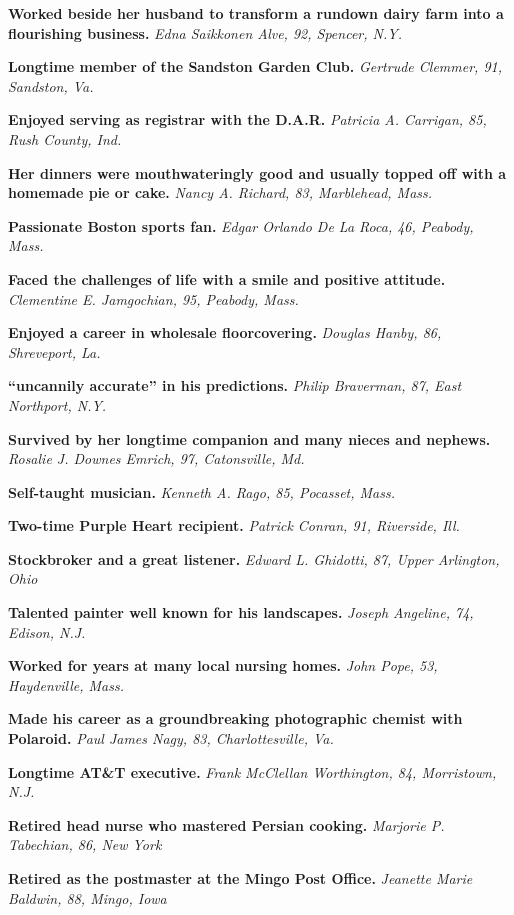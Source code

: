 \textbf{Worked beside her husband to transform a rundown dairy farm into
a flourishing business.} \emph{Edna Saikkonen Alve, 92, Spencer, N.Y.}

\textbf{Longtime member of the Sandston Garden Club.} \emph{Gertrude
Clemmer, 91, Sandston, Va.}

\textbf{Enjoyed serving as registrar with the D.A.R.} \emph{Patricia A.
Carrigan, 85, Rush County, Ind.}

\textbf{Her dinners were mouthwateringly good and usually topped off
with a homemade pie or cake.} \emph{Nancy A. Richard, 83, Marblehead,
Mass.}

\textbf{Passionate Boston sports fan.} \emph{Edgar Orlando De La Roca,
46, Peabody, Mass.}

\textbf{Faced the challenges of life with a smile and positive
attitude.} \emph{Clementine E. Jamgochian, 95, Peabody, Mass.}

\textbf{Enjoyed a career in wholesale floorcovering.} \emph{Douglas
Hanby, 86, Shreveport, La.}

\textbf{``uncannily accurate'' in his predictions.} \emph{Philip
Braverman, 87, East Northport, N.Y.}

\textbf{Survived by her longtime companion and many nieces and nephews.}
\emph{Rosalie J. Downes Emrich, 97, Catonsville, Md.}

\textbf{Self-taught musician.} \emph{Kenneth A. Rago, 85, Pocasset,
Mass.}

\textbf{Two-time Purple Heart recipient.} \emph{Patrick Conran, 91,
Riverside, Ill.}

\textbf{Stockbroker and a great listener.} \emph{Edward L. Ghidotti, 87,
Upper Arlington, Ohio}

\textbf{Talented painter well known for his landscapes.} \emph{Joseph
Angeline, 74, Edison, N.J.}

\textbf{Worked for years at many local nursing homes.} \emph{John Pope,
53, Haydenville, Mass.}

\textbf{Made his career as a groundbreaking photographic chemist with
Polaroid.} \emph{Paul James Nagy, 83, Charlottesville, Va.}

\textbf{Longtime AT\&T executive.} \emph{Frank McClellan Worthington,
84, Morristown, N.J.}

\textbf{Retired head nurse who mastered Persian cooking.} \emph{Marjorie
P. Tabechian, 86, New York}

\textbf{Retired as the postmaster at the Mingo Post Office.}
\emph{Jeanette Marie Baldwin, 88, Mingo, Iowa}

